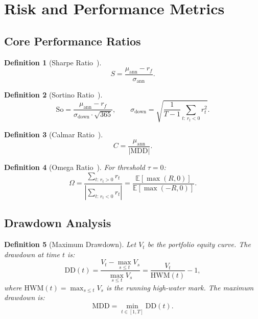 \documentclass[12pt,a4paper]{article}
\newtheorem{definition}{Definition}[section]
\newcommand{\E}{\mathbb{E}}
\begin{document}
\section{Risk and Performance Metrics}
\label{sec:metrics}

\subsection{Core Performance Ratios}

\begin{definition}[Sharpe Ratio~\cite{sharpe1966}]
\begin{equation}
    S = \frac{\mu_{\text{ann}} - r_f}{\sigma_{\text{ann}}}.
    \label{eq:sharpe}
\end{equation}
\end{definition}

\begin{definition}[Sortino Ratio~\cite{sortino1991}]
\begin{equation}
    \text{So} = \frac{\mu_{\text{ann}} - r_f}{\sigma_{\text{down}} \cdot \sqrt{365}},
    \qquad \sigma_{\text{down}} = \sqrt{\frac{1}{T-1}\sum_{t:\,r_t < 0} r_t^2}.
    \label{eq:sortino}
\end{equation}
\end{definition}

\begin{definition}[Calmar Ratio~\cite{young1991}]
\begin{equation}
    C = \frac{\mu_{\text{ann}}}{|\text{MDD}|}.
    \label{eq:calmar}
\end{equation}
\end{definition}

\begin{definition}[Omega Ratio~\cite{keating2002}]
For threshold $\tau = 0$:
\begin{equation}
    \Omega = \frac{\sum_{t:\,r_t > 0} r_t}{\left|\sum_{t:\,r_t < 0} r_t\right|} = \frac{\E[\max(R, 0)]}{\E[\max(-R, 0)]}.
    \label{eq:omega}
\end{equation}
\end{definition}

\subsection{Drawdown Analysis}

\begin{definition}[Maximum Drawdown]
Let $V_t$ be the portfolio equity curve. The drawdown at time $t$ is:
\begin{equation}
    \text{DD}(t) = \frac{V_t - \max_{s \leq t} V_s}{\max_{s \leq t} V_s} = \frac{V_t}{\text{HWM}(t)} - 1,
    \label{eq:drawdown}
\end{equation}
where $\text{HWM}(t) = \max_{s \leq t} V_s$ is the running high-water mark. The maximum drawdown is:
\begin{equation}
    \text{MDD} = \min_{t \in [1, T]} \text{DD}(t).
    \label{eq:mdd}
\end{equation}
\end{definition}
\end{document}
